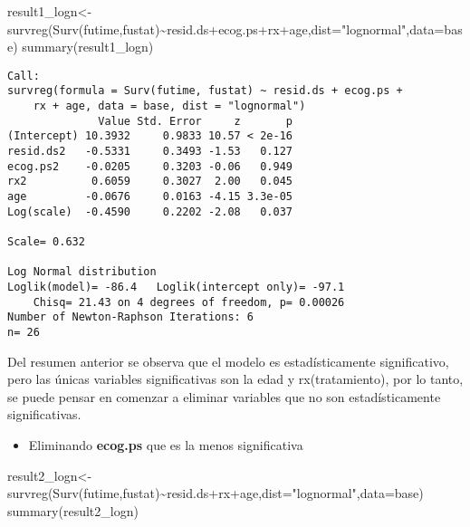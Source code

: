 \documentclass[
]{article}
\newenvironment{Shaded}{\begin{snugshade}}{\end{snugshade}}
\newcommand{\AttributeTok}[1]{\textcolor[rgb]{0.77,0.63,0.00}{#1}}
\newcommand{\FunctionTok}[1]{\textcolor[rgb]{0.00,0.00,0.00}{#1}}
\newcommand{\NormalTok}[1]{#1}
\newcommand{\OtherTok}[1]{\textcolor[rgb]{0.56,0.35,0.01}{#1}}
\newcommand{\SpecialCharTok}[1]{\textcolor[rgb]{0.00,0.00,0.00}{#1}}
\newcommand{\StringTok}[1]{\textcolor[rgb]{0.31,0.60,0.02}{#1}}
\providecommand{\tightlist}{%
  \setlength{\itemsep}{0pt}\setlength{\parskip}{0pt}}
\begin{document}
\begin{Shaded}
\begin{Highlighting}[]
\NormalTok{result1\_logn}\OtherTok{\textless{}{-}}\FunctionTok{survreg}\NormalTok{(}\FunctionTok{Surv}\NormalTok{(futime,fustat)}\SpecialCharTok{\textasciitilde{}}\NormalTok{resid.ds}\SpecialCharTok{+}\NormalTok{ecog.ps}\SpecialCharTok{+}\NormalTok{rx}\SpecialCharTok{+}\NormalTok{age,}\AttributeTok{dist=}\StringTok{"lognormal"}\NormalTok{,}\AttributeTok{data=}\NormalTok{base)}
\FunctionTok{summary}\NormalTok{(result1\_logn)}
\end{Highlighting}
\end{Shaded}

\begin{verbatim}
Call:
survreg(formula = Surv(futime, fustat) ~ resid.ds + ecog.ps + 
    rx + age, data = base, dist = "lognormal")
              Value Std. Error     z       p
(Intercept) 10.3932     0.9833 10.57 < 2e-16
resid.ds2   -0.5331     0.3493 -1.53   0.127
ecog.ps2    -0.0205     0.3203 -0.06   0.949
rx2          0.6059     0.3027  2.00   0.045
age         -0.0676     0.0163 -4.15 3.3e-05
Log(scale)  -0.4590     0.2202 -2.08   0.037

Scale= 0.632 

Log Normal distribution
Loglik(model)= -86.4   Loglik(intercept only)= -97.1
    Chisq= 21.43 on 4 degrees of freedom, p= 0.00026 
Number of Newton-Raphson Iterations: 6 
n= 26 
\end{verbatim}

Del resumen anterior se observa que el modelo es estadísticamente
significativo, pero las únicas variables significativas son la edad y
rx(tratamiento), por lo tanto, se puede pensar en comenzar a eliminar
variables que no son estadísticamente significativas.

\begin{itemize}
\tightlist
\item
  Eliminando \textbf{ecog.ps} que es la menos significativa
\end{itemize}

\begin{Shaded}
\begin{Highlighting}[]
\NormalTok{result2\_logn}\OtherTok{\textless{}{-}}\FunctionTok{survreg}\NormalTok{(}\FunctionTok{Surv}\NormalTok{(futime,fustat)}\SpecialCharTok{\textasciitilde{}}\NormalTok{resid.ds}\SpecialCharTok{+}\NormalTok{rx}\SpecialCharTok{+}\NormalTok{age,}\AttributeTok{dist=}\StringTok{"lognormal"}\NormalTok{,}\AttributeTok{data=}\NormalTok{base)}
\FunctionTok{summary}\NormalTok{(result2\_logn)}
\end{Highlighting}
\end{Shaded}
\end{document}
